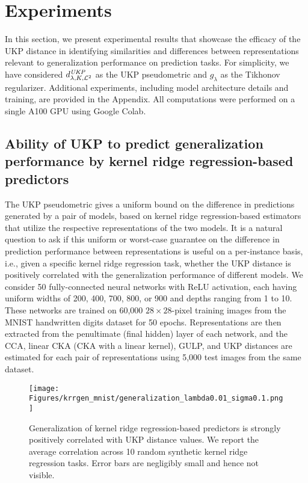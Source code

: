 \documentclass{article} %
\newcommand{\gl}{g_{\lambda}}
\newcommand{\metricstname}{UKP }
\newcommand{\dtwo}{d_{\lambda,K,\mathcal{L}^{2}}^{\emph{\metricstname}}}
\theoremstyle{plain}
\begin{document}
\section{Experiments} \label{experiments}

 In this section, we present experimental results that showcase the efficacy of the \metricstname distance in identifying similarities and differences between representations relevant to generalization performance on prediction tasks. For simplicity, we have considered $\dtwo$ as the \metricstname pseudometric and $\gl$ as the Tikhonov regularizer. Additional experiments, including model architecture details and training, are provided in the Appendix. All computations were performed on a single A100 GPU using Google Colab.

\subsection{Ability of \metricstname to predict generalization performance by kernel ridge regression-based predictors} \label{MNIST experiments}
The \metricstname pseudometric gives a uniform bound on the difference in predictions generated by a pair of models, based on kernel ridge regression-based estimators that utilize the respective representations of the two models. It is a natural question to ask if this uniform or worst-case guarantee on the difference in prediction performance between representations is useful on a per-instance basis, i.e., given a specific kernel ridge regression task, whether the \metricstname distance is positively correlated with the generalization performance of different models.
We consider 50 fully-connected neural networks with ReLU activation, each having uniform widths of 200, 400, 700, 800, or 900 and depths ranging from 1 to 10. These networks are trained on 60,000 $28 \times 28$-pixel training images from the MNIST handwritten digits dataset \citep{deng2012mnist} for 50 epochs. Representations are then extracted from the penultimate (final hidden) layer of each network, and the CCA, linear CKA (CKA with a linear kernel), GULP, and UKP distances are estimated for each pair of representations using 5,000 test images from the same dataset.
\begin{figure}[h]
\begin{center}
\texttt{[image: Figures/krrgen\_mnist/generalization\_lambda0.01\_sigma0.1.png]}
\caption{Generalization of kernel ridge regression-based predictors is strongly positively correlated with \metricstname distance values. We report the average correlation across 10 random synthetic kernel ridge regression tasks. Error bars are negligibly small and hence not visible.}
\label{Generalization plot}
\end{center}
\vspace{-4mm}
\end{figure}
\end{document}
